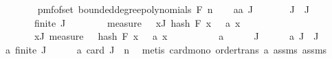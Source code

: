 \begin{isabellebody}
\isanewline
\ \ \isamarkupfalse%
\ {\isasymOmega}\ \ {\isachardoublequoteopen}{\isasymOmega}\ {\isacharequal}{\kern0pt}\ {\isacharparenleft}{\kern0pt}pmf{\isacharunderscore}{\kern0pt}of{\isacharunderscore}{\kern0pt}set\ {\isacharparenleft}{\kern0pt}bounded{\isacharunderscore}{\kern0pt}degree{\isacharunderscore}{\kern0pt}polynomials\ F\ n{\isacharparenright}{\kern0pt}{\isacharparenright}{\kern0pt}{\isachardoublequoteclose}\isanewline
\ \ \isamarkupfalse%
\ a{\isacharcolon}{\kern0pt}{\isachardoublequoteopen}{\isasymAnd}a\ J{\isacharprime}{\kern0pt}{\isachardot}{\kern0pt}\isanewline
\ \ \ \ \ \ \ J{\isacharprime}{\kern0pt}\ {\isasymsubseteq}\ J\ {\isasymLongrightarrow}\isanewline
\ \ \ \ \ \ \ finite\ J{\isacharprime}{\kern0pt}\ {\isasymLongrightarrow}\isanewline
\ \ \ \ \ \ \ measure\ {\isasymOmega}\ {\isacharbraceleft}{\kern0pt}{\isasymomega}{\isachardot}{\kern0pt}\ {\isasymforall}x{\isasymin}J{\isacharprime}{\kern0pt}{\isachardot}{\kern0pt}\ hash\ F\ x\ {\isasymomega}\ {\isacharequal}{\kern0pt}\ a\ x{\isacharbraceright}{\kern0pt}\ {\isacharequal}{\kern0pt}\isanewline
\ \ \ \ \ \ \ {\isacharparenleft}{\kern0pt}{\isasymProd}x{\isasymin}J{\isacharprime}{\kern0pt}{\isachardot}{\kern0pt}\ measure\ {\isasymOmega}\ {\isacharbraceleft}{\kern0pt}{\isasymomega}{\isachardot}{\kern0pt}\ hash\ F\ x\ {\isasymomega}\ {\isacharequal}{\kern0pt}\ a\ x{\isacharbraceright}{\kern0pt}{\isacharparenright}{\kern0pt}{\isachardoublequoteclose}\isanewline
\ \ \isamarkupfalse%
\ {\isacharminus}{\kern0pt}\isanewline
\ \ \ \ \isamarkupfalse%
\ a\isanewline
\ \ \ \ \isamarkupfalse%
\ J{\isacharprime}{\kern0pt}\isanewline
\ \ \ \ \isamarkupfalse%
\ a{\isacharunderscore}{\kern0pt}{}{\isacharcolon}{\kern0pt}\ {\isachardoublequoteopen}J{\isacharprime}{\kern0pt}\ {\isasymsubseteq}\ J{\isachardoublequoteclose}\isanewline
\ \ \ \ \isamarkupfalse%
\ a{\isacharunderscore}{\kern0pt}{}{}{\isacharcolon}{\kern0pt}\ {\isachardoublequoteopen}finite\ J{\isacharprime}{\kern0pt}{\isachardoublequoteclose}\isanewline
\ \ \ \ \isamarkupfalse%
\ a{\isacharunderscore}{\kern0pt}{}{\isacharcolon}{\kern0pt}\ {\isachardoublequoteopen}card\ J{\isacharprime}{\kern0pt}\ {\isasymle}\ n{\isachardoublequoteclose}\ \isamarkupfalse%
\ {\isacharparenleft}{\kern0pt}metis\ card{\isacharunderscore}{\kern0pt}mono\ order{\isacharunderscore}{\kern0pt}trans\ a{\isacharunderscore}{\kern0pt}{}\ assms{\isacharparenleft}{\kern0pt}{}{\isacharparenright}{\kern0pt}\ assms{\isacharparenleft}{\kern0pt}{}{\isacharparenright}{\kern0pt}{\isacharparenright}{\kern0pt}\isanewline

\end{isabellebody}
